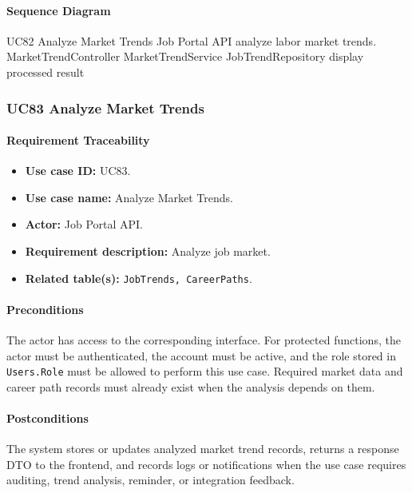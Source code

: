 \paragraph{Sequence Diagram}

\SequenceDiagram
{UC82 Analyze Market Trends}
{Job Portal API}
{analyze labor market trends.}
{MarketTrendController}
{MarketTrendService}
{JobTrendRepository}
{display processed result}
\subsubsection{UC83 Analyze Market Trends}

\paragraph{Requirement Traceability}

\begin{itemize}
    \item \textbf{Use case ID:} UC83.
    \item \textbf{Use case name:} Analyze Market Trends.
    \item \textbf{Actor:} Job Portal API.
    \item \textbf{Requirement description:} Analyze job market.
    \item \textbf{Related table(s):} \texttt{JobTrends, CareerPaths}.
\end{itemize}

\paragraph{Preconditions}

The actor has access to the corresponding interface. For protected functions, the actor must be authenticated, the account must be active, and the role stored in \texttt{Users.Role} must be allowed to perform this use case. Required market data and career path records must already exist when the analysis depends on them.

\paragraph{Postconditions}

The system stores or updates analyzed market trend records, returns a response DTO to the frontend, and records logs or notifications when the use case requires auditing, trend analysis, reminder, or integration feedback.

